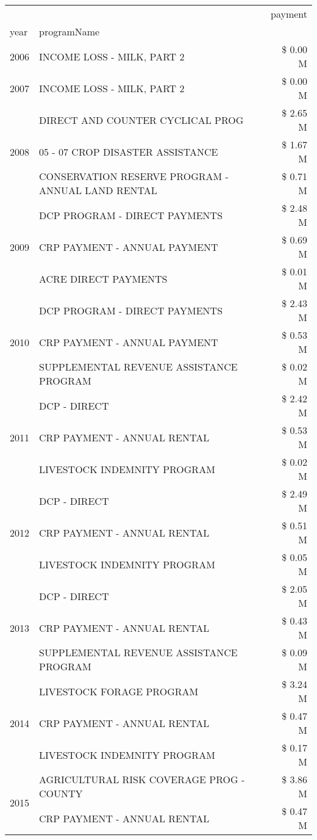 \begin{tabular}{llr}
\toprule
 &  & payment \\
year & programName &  \\
\midrule
2006 & INCOME LOSS - MILK, PART 2 & \$ 0.00 M \\
\cline{1-3}
2007 & INCOME LOSS - MILK, PART 2 & \$ 0.00 M \\
\cline{1-3}
\multirow[t]{3}{*}{2008} & DIRECT AND COUNTER CYCLICAL PROG & \$ 2.65 M \\
 & 05 - 07 CROP DISASTER ASSISTANCE & \$ 1.67 M \\
 & CONSERVATION RESERVE PROGRAM - ANNUAL LAND RENTAL & \$ 0.71 M \\
\cline{1-3}
\multirow[t]{3}{*}{2009} & DCP PROGRAM - DIRECT PAYMENTS & \$ 2.48 M \\
 & CRP PAYMENT - ANNUAL PAYMENT & \$ 0.69 M \\
 & ACRE DIRECT PAYMENTS & \$ 0.01 M \\
\cline{1-3}
\multirow[t]{3}{*}{2010} & DCP PROGRAM - DIRECT PAYMENTS & \$ 2.43 M \\
 & CRP PAYMENT - ANNUAL PAYMENT & \$ 0.53 M \\
 & SUPPLEMENTAL REVENUE ASSISTANCE PROGRAM & \$ 0.02 M \\
\cline{1-3}
\multirow[t]{3}{*}{2011} & DCP - DIRECT & \$ 2.42 M \\
 & CRP PAYMENT - ANNUAL RENTAL & \$ 0.53 M \\
 & LIVESTOCK INDEMNITY PROGRAM & \$ 0.02 M \\
\cline{1-3}
\multirow[t]{3}{*}{2012} & DCP - DIRECT & \$ 2.49 M \\
 & CRP PAYMENT - ANNUAL RENTAL & \$ 0.51 M \\
 & LIVESTOCK INDEMNITY PROGRAM & \$ 0.05 M \\
\cline{1-3}
\multirow[t]{3}{*}{2013} & DCP - DIRECT & \$ 2.05 M \\
 & CRP PAYMENT - ANNUAL RENTAL & \$ 0.43 M \\
 & SUPPLEMENTAL REVENUE ASSISTANCE PROGRAM & \$ 0.09 M \\
\cline{1-3}
\multirow[t]{3}{*}{2014} & LIVESTOCK FORAGE PROGRAM & \$ 3.24 M \\
 & CRP PAYMENT - ANNUAL RENTAL & \$ 0.47 M \\
 & LIVESTOCK INDEMNITY PROGRAM & \$ 0.17 M \\
\cline{1-3}
\multirow[t]{3}{*}{2015} & AGRICULTURAL RISK COVERAGE PROG - COUNTY & \$ 3.86 M \\
 & CRP PAYMENT - ANNUAL RENTAL & \$ 0.47 M \\

\end{tabular}
